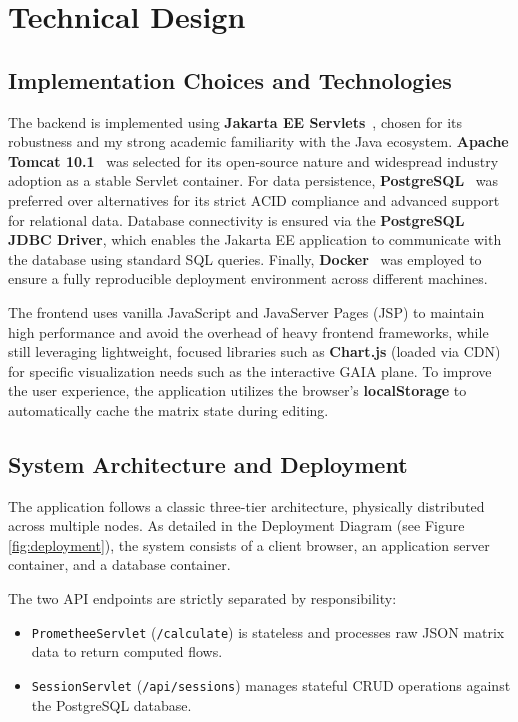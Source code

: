 \documentclass[12pt,a4paper,oneside]{report}
\begin{document}
\chapter{Technical Design}

\section{Implementation Choices and Technologies}
The backend is implemented using \textbf{Jakarta EE Servlets}~\cite{jakartaee}, chosen for its robustness and my strong academic familiarity with the Java ecosystem. \textbf{Apache Tomcat 10.1}~\cite{TomcatDoc} was selected for its open-source nature and widespread industry adoption as a stable Servlet container. For data persistence, \textbf{PostgreSQL}~\cite{PostgreSQLDoc} was preferred over alternatives for its strict ACID compliance and advanced support for relational data. Database connectivity is ensured via the \textbf{PostgreSQL JDBC Driver}, which enables the Jakarta EE application to communicate with the database using standard SQL queries. Finally, \textbf{Docker}~\cite{DockerDoc} was employed to ensure a fully reproducible deployment environment across different machines.

The frontend uses vanilla JavaScript and JavaServer Pages (JSP) to maintain high performance and avoid the overhead of heavy frontend frameworks, while still leveraging lightweight, focused libraries such as \textbf{Chart.js} (loaded via CDN) for specific visualization needs such as the interactive GAIA plane. To improve the user experience, the application utilizes the browser's \textbf{localStorage} to automatically cache the matrix state during editing.

\section{System Architecture and Deployment}
The application follows a classic three-tier architecture, physically distributed across multiple nodes. As detailed in the Deployment Diagram (see Figure \ref{fig:deployment}), the system consists of a client browser, an application server container, and a database container.

The two API endpoints are strictly separated by responsibility: 
\begin{itemize}
    \item \texttt{PrometheeServlet} (\texttt{/calculate}) is stateless and processes raw JSON matrix data to return computed flows.
    \item \texttt{SessionServlet} (\texttt{/api/sessions}) manages stateful CRUD operations against the PostgreSQL database.
\end{itemize}
\end{document}
